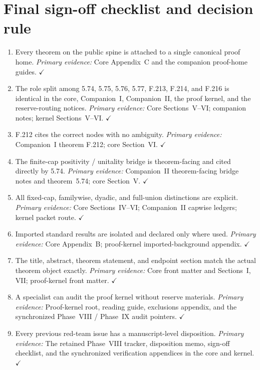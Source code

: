 \section{Final sign-off checklist and decision rule}\label{sec:p9-checklist}

\begin{enumerate}[leftmargin=2.2em,label=\textup{\arabic*.}]
\item Every theorem on the public spine is attached to a single canonical proof home. \emph{Primary evidence:} Core Appendix~C and the companion proof-home guides. \hfill $\checkmark$

\item The role split among 5.74, 5.75, 5.76, 5.77, F.213, F.214, and F.216 is identical in the core, Companion~I, Companion~II, the proof kernel, and the reserve-routing notices. \emph{Primary evidence:} Core Sections~V--VI; companion notes; kernel Sections~V--VI. \hfill $\checkmark$

\item F.212 cites the correct nodes with no ambiguity. \emph{Primary evidence:} Companion~I theorem F.212; core Section~VI. \hfill $\checkmark$

\item The finite-cap positivity / unitality bridge is theorem-facing and cited directly by 5.74. \emph{Primary evidence:} Companion~II theorem-facing bridge notes and theorem~5.74; core Section~V. \hfill $\checkmark$

\item All fixed-cap, familywise, dyadic, and full-union distinctions are explicit. \emph{Primary evidence:} Core Sections~IV--VI; Companion~II capwise ledgers; kernel packet route. \hfill $\checkmark$

\item Imported standard results are isolated and declared only where used. \emph{Primary evidence:} Core Appendix~B; proof-kernel imported-background appendix. \hfill $\checkmark$

\item The title, abstract, theorem statement, and endpoint section match the actual theorem object exactly. \emph{Primary evidence:} Core front matter and Sections~I, VII; proof-kernel front matter. \hfill $\checkmark$

\item A specialist can audit the proof kernel without reserve materials. \emph{Primary evidence:} Proof-kernel root, reading guide, exclusions appendix, and the synchronized Phase~VIII / Phase~IX audit pointers. \hfill $\checkmark$

\item Every previous red-team issue has a manuscript-level disposition. \emph{Primary evidence:} The retained Phase~VIII tracker, disposition memo, sign-off checklist, and the synchronized verification appendices in the core and kernel. \hfill $\checkmark$
\end{enumerate}

